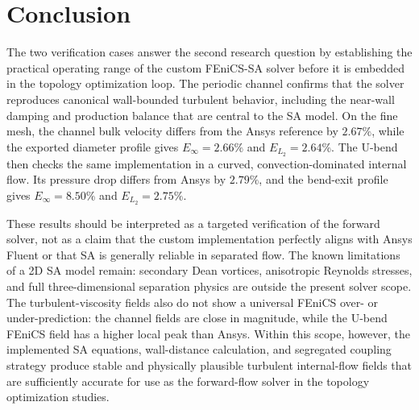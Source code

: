 \section{Conclusion}
\label{sec:sa_verification_conclusion}
The two verification cases answer the second research question by establishing the practical operating range of the custom FEniCS-SA solver before it is embedded in the topology optimization loop. The periodic channel confirms that the solver reproduces canonical wall-bounded turbulent behavior, including the near-wall damping and production balance that are central to the SA model. On the fine mesh, the channel bulk velocity differs from the Ansys reference by $2.67\%$, while the exported diameter profile gives $E_{\infty}=2.66\%$ and $E_{L_2}=2.64\%$. The U-bend then checks the same implementation in a curved, convection-dominated internal flow. Its pressure drop differs from Ansys by $2.79\%$, and the bend-exit profile gives $E_{\infty}=8.50\%$ and $E_{L_2}=2.75\%$.

These results should be interpreted as a targeted verification of the forward solver, not as a claim that the custom implementation perfectly aligns with Ansys Fluent or that SA is generally reliable in separated flow. The known limitations of a 2D SA model remain: secondary Dean vortices, anisotropic Reynolds stresses, and full three-dimensional separation physics are outside the present solver scope. The turbulent-viscosity fields also do not show a universal FEniCS over- or under-prediction: the channel fields are close in magnitude, while the U-bend FEniCS field has a higher local peak than Ansys. Within this scope, however, the implemented SA equations, wall-distance calculation, and segregated coupling strategy produce stable and physically plausible turbulent internal-flow fields that are sufficiently accurate for use as the forward-flow solver in the topology optimization studies.
